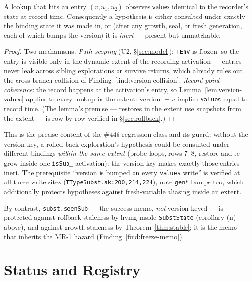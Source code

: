 \documentclass[11pt]{article}
\begin{document}
\begin{lemma}
\label{lem:tenv-inert}
A lookup that hits an entry $(v, u_1, u_2)$ observes
$\mathsf{values}$ identical to the recorder's state at record time.
Consequently a hypothesis is either consulted under exactly the binding
state it was made in, or (after any growth, seal, or fresh generation,
each of which bumps the version) it is \emph{inert} — present but
unmatchable.
\end{lemma}
\begin{proof}
Two mechanisms. \emph{Path-scoping} (U2, \S\ref{sec:model}):
\texttt{TEnv} is frozen, so the entry is visible only in the dynamic
extent of the recording activation — entries never leak across sibling
explorations or survive returns, which already rules out the
cross-branch collision of Finding~\ref{find:version-collision}.
\emph{Record-point coherence}: the record happens at the activation's
entry, so Lemma~\ref{lem:version-values} applies to every lookup in the
extent: version $= v$ implies \texttt{values} equal to record time.
(The lemma's premise — restores in the extent use snapshots from the
extent — is row-by-row verified in \S\ref{sec:rollback}.)
\end{proof}

This is the precise content of the \#446 regression class and its guard:
without the version key, a rolled-back exploration's hypothesis could be
consulted under different bindings \emph{within the same extent} (probe
loops, rows 7--8, restore and re-grow inside one \texttt{isSub\_}
activation); the version key makes exactly those entries inert. The
prerequisite ``version is bumped on every \texttt{values} write'' is
verified at all three write sites (\texttt{TTypeSubst.sk:200,214,224});
note \texttt{gen*} bumps too, which additionally protects hypotheses
against fresh-variable aliasing inside an extent.

By contrast, \texttt{subst.seenSub} — the success memo, \emph{not}
version-keyed — is protected against rollback staleness by living inside
\texttt{SubstState} (corollary (ii) above), and against growth staleness
by Theorem~\ref{thm:stable}; it is the memo that inherits the MR-1
hazard (Finding~\ref{find:freeze-memo}).

\section{Status and Registry}
\label{sec:status}
\end{document}
